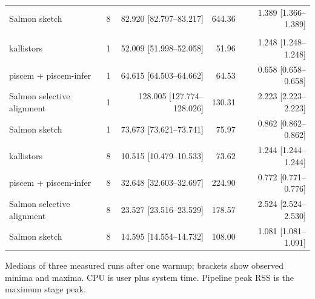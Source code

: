 \begin{longtable}{@{}lrrrr@{}}
Salmon sketch & 8 & 82.920 [82.797--83.217] & 644.36 & 1.389 [1.366--1.389] \\
\addlinespace
\multicolumn{5}{@{}l}{\textit{fragment-truth}} \\
kallistors & 1 & 52.009 [51.998--52.058] & 51.96 & 1.248 [1.248--1.248] \\
piscem + piscem-infer & 1 & 64.615 [64.503--64.662] & 64.53 & 0.658 [0.658--0.658] \\
Salmon selective alignment & 1 & 128.005 [127.774--128.026] & 130.31 & 2.223 [2.223--2.223] \\
Salmon sketch & 1 & 73.673 [73.621--73.741] & 75.97 & 0.862 [0.862--0.862] \\
kallistors & 8 & 10.515 [10.479--10.533] & 73.62 & 1.244 [1.244--1.244] \\
piscem + piscem-infer & 8 & 32.648 [32.603--32.697] & 224.90 & 0.772 [0.771--0.776] \\
Salmon selective alignment & 8 & 23.527 [23.516--23.529] & 178.57 & 2.524 [2.524--2.530] \\
Salmon sketch & 8 & 14.595 [14.554--14.732] & 108.00 & 1.081 [1.081--1.091] \\
\end{longtable}
\noindent\footnotesize Medians of three measured runs after one warmup; brackets show observed minima and maxima. CPU is user plus system time. Pipeline peak RSS is the maximum stage peak.
\endgroup
